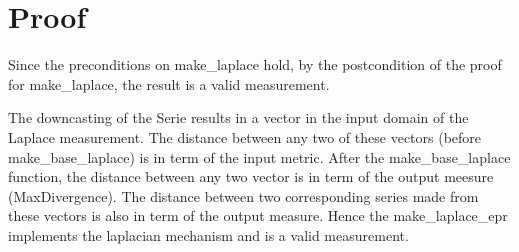 \documentclass{article} %
\begin{document}
\section{Proof}
Since the preconditions on make\_laplace hold, by the postcondition of the proof for make\_laplace, the result is a valid measurement.

The downcasting of the Serie results in a vector in the input domain of the Laplace measurement. The distance between any two of these vectors (before make\_base\_laplace) is in term of the input metric. 
After the make\_base\_laplace function, the distance between any two vector is in term of the output meesure (MaxDivergence). The distance between two corresponding series made from these vectors is also in term of the output measure.
Hence the make\_laplace\_epr implements the laplacian mechanism and is a valid measurement.
\end{document}
